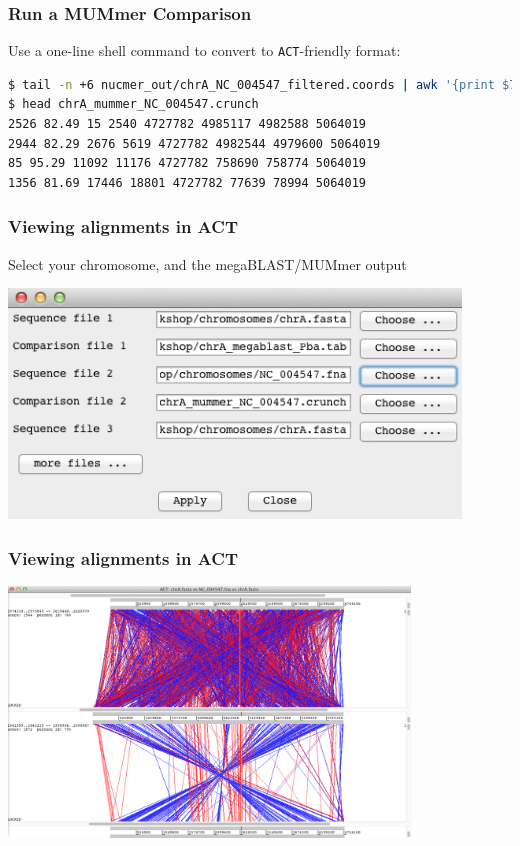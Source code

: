 \documentclass[table]{beamer}
\begin{document}
  \begin{frame}[fragile]
    \frametitle{Run a MUMmer Comparison}
    Use a one-line shell command to convert to \texttt{ACT}-friendly format:
\begin{lstlisting}[language=bash]
$ tail -n +6 nucmer_out/chrA_NC_004547_filtered.coords | awk '{print $7" "$10" "$1" "$2" "$12" "$4" "$5" "$13}' > chrA_mummer_NC_004547.crunch
$ head chrA_mummer_NC_004547.crunch 
2526 82.49 15 2540 4727782 4985117 4982588 5064019
2944 82.29 2676 5619 4727782 4982544 4979600 5064019
85 95.29 11092 11176 4727782 758690 758774 5064019
1356 81.69 17446 18801 4727782 77639 78994 5064019
\end{lstlisting}
\end{frame}

    \begin{frame}
      \frametitle{Viewing alignments in ACT}    
      Select your chromosome, and the megaBLAST/MUMmer output
      \begin{center}
        \includegraphics[width=0.9\textwidth]{images/act_wgs8}     
      \end{center}
    \end{frame}

    \begin{frame}
      \frametitle{Viewing alignments in ACT}    
      \begin{center}
        \includegraphics[width=0.8\textwidth]{images/act_wgs9}     
      \end{center}
    \end{frame}
\end{document}
